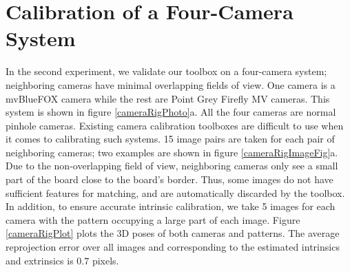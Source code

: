 \documentclass{report}
\begin{document}
\section{Calibration of a Four-Camera System}
In the second experiment, we validate our toolbox on a four-camera system; neighboring cameras have minimal overlapping fields of view. One camera is a mvBlueFOX camera while the rest are Point Grey Firefly MV cameras. This system is shown in figure \ref{cameraRigPhoto}a. All the four cameras are normal pinhole cameras. Existing camera calibration toolboxes are difficult to use when it comes to calibrating such systems. 15 image pairs are taken for each pair of neighboring cameras; two examples are shown in figure \ref{cameraRigImageFig}a. Due to the non-overlapping field of view, neighboring cameras only see a small part of the board close to the board's border. Thus, some images do not have sufficient features for matching, and are automatically discarded by the toolbox. In addition, to ensure accurate intrinsic calibration, we take 5 images for each camera with the pattern occupying a large part of each image. Figure \ref{cameraRigPlot} plots the 3D poses of both cameras and patterns. The average reprojection error over all images and corresponding to the estimated intrinsics and extrinsics is $0.7$ pixels. 

\end{document}
